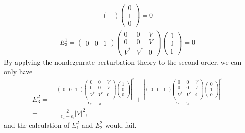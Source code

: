 \begin{enumerate}
\begin{align*}
\begin{pmatrix}
        \end{pmatrix}
        \begin{pmatrix}
            0\\1\\0
        \end{pmatrix} = 0
    \end{align*}
    \begin{align*}
        E^1_3=\begin{pmatrix}
            0&0&1
        \end{pmatrix}
        \begin{pmatrix}
            0 & 0 & V \\
            0 & 0 & V \\
            V^* & V^* & 0
        \end{pmatrix}
        \begin{pmatrix}
            0\\0\\1
        \end{pmatrix} = 0
    \end{align*}
    By applying the nondegenrate perturbation theory to the second order, we can only have 
    \begin{align*}
        E^2_3 =& \frac{\left|
    \begin{pmatrix}
        0 & 0 & 1
    \end{pmatrix}
    \begin{pmatrix}
        0 & 0 & V\\
        0 & 0 & V\\
        V^* & V^* & 0\\
    \end{pmatrix}
    \begin{pmatrix}
        1 \\ 0 \\ 0
    \end{pmatrix}
    \right|^2}{\epsilon_c-\epsilon_a}
    +
    \frac{\left|
    \begin{pmatrix}
        0 & 0 & 1
    \end{pmatrix}
    \begin{pmatrix}
        0 & 0 & V\\
        0 & 0 & V\\
        V^* & V^* & 0\\
    \end{pmatrix}
    \begin{pmatrix}
        0 \\ 1 \\ 0
    \end{pmatrix}
    \right|^2}{\epsilon_c-\epsilon_a}\\
    =&-\frac{2}{\epsilon_a-\epsilon_c}|V|^2,
    \end{align*}
    and the calculation of $E_1^2$ and $E_2^2$ would fail.
\end{enumerate}

